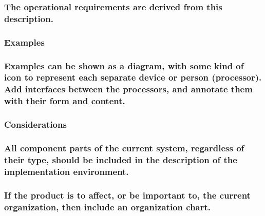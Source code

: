 \documentclass[
]{article}
\begin{document}
\hypertarget{the-operational-requirements-are-derived-from-this-description.}{%
\subsubsection{The operational requirements are derived from this
description.}\label{the-operational-requirements-are-derived-from-this-description.}}

\hypertarget{examples-3}{%
\subsubsection{Examples}\label{examples-3}}

\hypertarget{examples-can-be-shown-as-a-diagram-with-some-kind-of-icon-to-represent-each-separate-device-or-person-processor.-add-interfaces-between-the-processors-and-annotate-them-with-their-form-and-content.}{%
\subsubsection{Examples can be shown as a diagram, with some kind of
icon to represent each separate device or person (processor). Add
interfaces between the processors, and annotate them with their form and
content.}\label{examples-can-be-shown-as-a-diagram-with-some-kind-of-icon-to-represent-each-separate-device-or-person-processor.-add-interfaces-between-the-processors-and-annotate-them-with-their-form-and-content.}}

\hypertarget{considerations-3}{%
\subsubsection{Considerations}\label{considerations-3}}

\hypertarget{all-component-parts-of-the-current-system-regardless-of-their-type-should-be-included-in-the-description-of-the-implementation-environment.}{%
\subsubsection{All component parts of the current system, regardless of
their type, should be included in the description of the implementation
environment.}\label{all-component-parts-of-the-current-system-regardless-of-their-type-should-be-included-in-the-description-of-the-implementation-environment.}}

\hypertarget{if-the-product-is-to-affect-or-be-important-to-the-current-organization-then-include-an-organization-chart.}{%
\subsubsection{\texorpdfstring{If the product is to affect, or be
important to, the current organization, then include an organization
chart.
}{If the product is to affect, or be important to, the current organization, then include an organization chart. }}\label{if-the-product-is-to-affect-or-be-important-to-the-current-organization-then-include-an-organization-chart.}}
\end{document}
